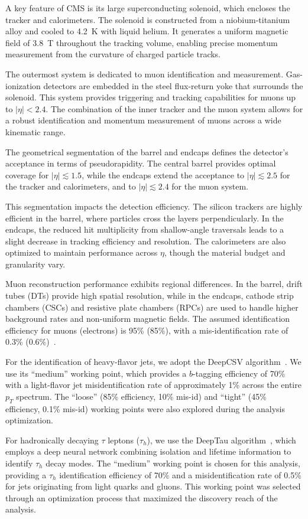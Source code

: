 A key feature of CMS is its large superconducting solenoid, which encloses the tracker and calorimeters. The solenoid is constructed from a niobium-titanium alloy and cooled to 4.2~K with liquid helium. It generates a uniform magnetic field of 3.8~T throughout the tracking volume, enabling precise momentum measurement from the curvature of charged particle tracks.

The outermost system is dedicated to muon identification and measurement. Gas-ionization detectors are embedded in the steel flux-return yoke that surrounds the solenoid. This system provides triggering and tracking capabilities for muons up to $|\eta| < 2.4$. The combination of the inner tracker and the muon system allows for a robust identification and momentum measurement of muons across a wide kinematic range.

The geometrical segmentation of the barrel and endcaps defines the detector's acceptance in terms of pseudorapidity. The central barrel provides optimal coverage for $|\eta| \lesssim 1.5$, while the endcaps extend the acceptance to $|\eta| \lesssim 2.5$ for the tracker and calorimeters, and to $|\eta| \lesssim 2.4$ for the muon system.

This segmentation impacts the detection efficiency. The silicon trackers are highly efficient in the barrel, where particles cross the layers perpendicularly. In the endcaps, the reduced hit multiplicity from shallow-angle traversals leads to a slight decrease in tracking efficiency and resolution. The calorimeters are also optimized to maintain performance across $\eta$, though the material budget and granularity vary.

Muon reconstruction performance exhibits regional differences. In the barrel, drift tubes (DTs) provide high spatial resolution, while in the endcaps, cathode strip chambers (CSCs) and resistive plate chambers (RPCs) are used to handle higher background rates and non-uniform magnetic fields. The assumed identification efficiency for muons (electrons) is 95\% (85\%), with a mis-identification rate of 0.3\% (0.6\%)~\parencite{CMS-PAS-FTR-13-014,CMS_MUON_17001,CMS_EGM_17001}.

For the identification of heavy-flavor jets, we adopt the DeepCSV algorithm~\parencite{CMS_BTV2016}. We use its ``medium'' working point, which provides a $b$-tagging efficiency of 70\% with a light-flavor jet misidentification rate of approximately 1\% across the entire $p_T$ spectrum. The ``loose'' (85\% efficiency, 10\% mis-id) and ``tight'' (45\% efficiency, 0.1\% mis-id) working points were also explored during the analysis optimization.

For hadronically decaying $\tau$ leptons ($\tau_h$), we use the DeepTau algorithm~\parencite{CMS_DeepTau}, which employs a deep neural network combining isolation and lifetime information to identify $\tau_h$ decay modes. The ``medium'' working point is chosen for this analysis, providing a $\tau_h$ identification efficiency of 70\% and a misidentification rate of 0.5\% for jets originating from light quarks and gluons. This working point was selected through an optimization process that maximized the discovery reach of the analysis.
